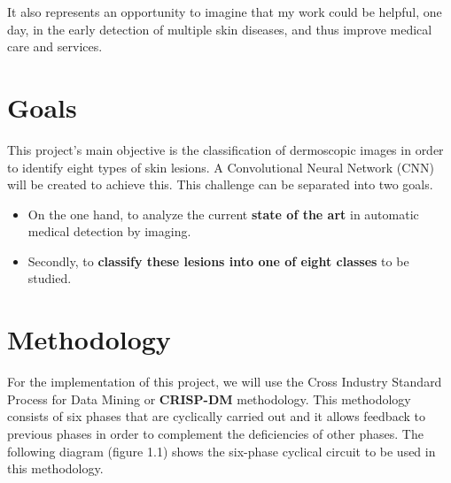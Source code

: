 It also represents an opportunity to imagine that my work could be helpful, one day, in the early detection of multiple skin diseases, and thus improve medical care and services.



\section{Goals}


This project's main objective is the classification of dermoscopic images in order to identify eight types of skin lesions. A Convolutional Neural Network (CNN) will be created to achieve this. This challenge can be separated into two goals.

\begin{itemize}
    \item On the one hand, to analyze the current \textbf{state of the art} in automatic medical detection by imaging.
    \item Secondly, to \textbf{classify these lesions into one of eight classes} to be studied.
\end{itemize}

\section{Methodology}


For the implementation of this project, we will use the Cross Industry Standard Process for Data Mining or \textbf{CRISP-DM} methodology. This methodology consists of six phases that are cyclically carried out and it allows feedback to previous phases in order to complement the deficiencies of other phases. The following diagram (figure 1.1) shows the six-phase cyclical circuit to be used in this methodology.

